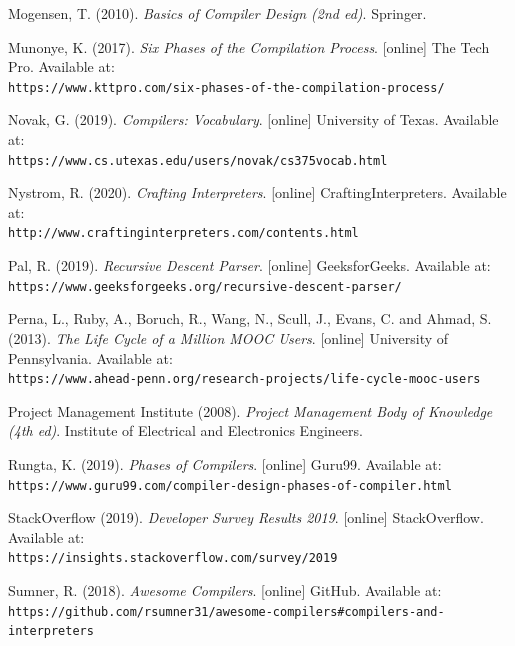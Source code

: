 \documentclass[
]{report}
\begin{document}
\begin{thebibliography}{24}
	Mogensen, T. (2010).
	\textit{Basics of Compiler Design (2nd ed)}.
	Springer.
	
	Munonye, K. (2017).
	\textit{Six Phases of the Compilation Process}.
	[online] The Tech Pro. Available at:
	\\\texttt{https://www.kttpro.com/six-phases-of-the-compilation-process/}
	
	Novak, G. (2019).
	\textit{Compilers: Vocabulary}.
	[online] University of Texas. Available at:
	\\\texttt{https://www.cs.utexas.edu/users/novak/cs375vocab.html}
	
	Nystrom, R. (2020).
	\textit{Crafting Interpreters}.
	[online] CraftingInterpreters. Available at:
	\\\texttt{http://www.craftinginterpreters.com/contents.html}
	
	Pal, R. (2019).
	\textit{Recursive Descent Parser}.
	[online] GeeksforGeeks. Available at:
	\\\texttt{https://www.geeksforgeeks.org/recursive-descent-parser/}
	
	Perna, L., Ruby, A., Boruch, R., Wang, N., Scull, J., Evans, C. and Ahmad, S. (2013).
	\textit{The Life Cycle of a Million MOOC Users}.
	[online] University of Pennsylvania. Available at:
	\\\texttt{https://www.ahead-penn.org/research-projects/life-cycle-mooc-users}
	
	Project Management Institute (2008).
	\textit{Project Management Body of Knowledge (4th ed)}.
	Institute of Electrical and Electronics Engineers.
	
	Rungta, K. (2019).
	\textit{Phases of Compilers}.
	[online] Guru99. Available at:
	\\\texttt{https://www.guru99.com/compiler-design-phases-of-compiler.html}
	
	StackOverflow (2019).
	\textit{Developer Survey Results 2019}.
	[online] StackOverflow. Available at:
	\\\texttt{https://insights.stackoverflow.com/survey/2019}
	
	Sumner, R. (2018).
	\textit{Awesome Compilers}.
	[online] GitHub. Available at:
	\\\texttt{https://github.com/rsumner31/awesome-compilers\#compilers-and-interpreters}
	

\end{thebibliography}
\end{document}
